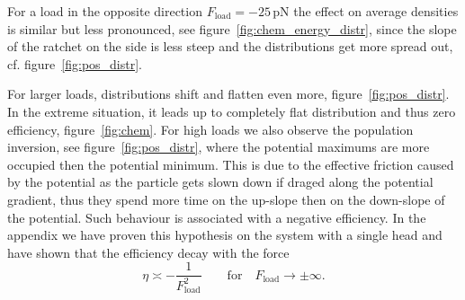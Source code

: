 \documentclass[aps,pre,twocolumn,showpacs,showkeys,superscriptaddress,floatfix]{revtex4-1}
\begin{document}
For a load in the opposite direction $F_\text{load}= -25 \, \mathrm{pN}$ the effect on average densities is similar but less pronounced, 
see figure~\ref{fig:chem_energy_distr}, 
since the slope of the ratchet on the side is less steep and the distributions get more spread out, cf. figure~\ref{fig:pos_distr}. 

For larger loads, distributions shift and flatten even more, figure~\ref{fig:pos_distr}. 
In the extreme situation, it leads up to completely flat distribution and thus zero efficiency, figure~\ref{fig:chem}.
For high loads we also observe the population inversion, see figure~\ref{fig:pos_distr}, 
where the potential maximums are more occupied then the potential minimum. 
This is due to the effective friction caused by the potential as the particle gets slown down if draged along the potential gradient, thus they spend more time on the up-slope then on the down-slope of the potential.
Such behaviour is associated with a negative efficiency. 
In the appendix we have proven this hypothesis on the system with a single head and have shown that the efficiency decay with the force 
\[
\eta \asymp - \frac{1}{ F_\text{load}^2 } \qquad \text{for} \quad F_\text{load} \to \pm \infty .
\]
\end{document}
